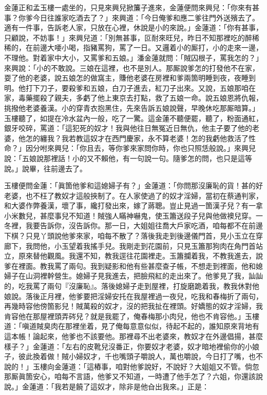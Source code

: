 金蓮正和孟玉樓一處坐的，只見來興兒掀簾子進來，金蓮便問來興兒：「你來有甚事？你爹今日往誰家吃酒去了？」來興道：「今日俺爹和應二爹往門外送殯去了。適有一件事，告訴老人家，只放在心裡，休說是小的來說。」金蓮道：「你有甚事，只顧說，不妨事！」來興兒道：「別無甚事，叵耐來旺兒，昨日不知那裡吃的醉稀稀的，在前邊大喓小喝，指豬罵狗，罵了一日。又邏着小的厮打，小的走來一邊，不理他。對着家中大小，又罵爹和五娘。」潘金蓮就問：「賊囚根子，罵我怎的？」來興說：「小的不敢說。三娘在這裡，也不是別人。那厮說爹怎的打發他不在家，耍了他的老婆，說五娘怎的做窩主，賺他老婆在房裡和爹兩箇明睡到夜，夜睡到明。他打下刀子，要殺爹和五娘，白刀子進去，紅刀子出來。又說，五娘那咱在家，毒藥擺殺了親夫，多虧了他上東京去打點，救了五娘一命。說五娘恩將仇報，挑撥他老婆養漢。小的穿青衣抱黑住，先來告訴五娘說聲，早晚休吃那厮暗算。」玉樓聽了，如提在冷水盆內一般，吃了一驚。這金蓮不聽便罷，聽了，粉面通紅，銀牙咬碎，罵道：「這犯死的奴才！我與他往日無冤近日無仇，他主子要了他的老婆，他怎的纏我？我若教這奴才在西門慶家，永不算老婆！怎的我虧他救活了性命？」因分咐來興兒：「你且去，等你爹來家問你時，你也只照恁般說。」來興兒說：「五娘說那裡話！小的又不賴他，有一句說一句。隨爹怎的問，也只是這等說。」{}說畢，往前邊去了。

玉樓便問金蓮：「眞箇他爹和這媳婦子有？」{}金蓮道：「你問那沒廉恥的貨！甚的好老婆，也不枉了教奴才這般挾制了。在人家使過了的奴才淫婦，當初在蔡通判家，和大婆作弊養漢，壞了事，纔打發出來，嫁了蔣聰。{}豈止見過一箇漢子兒？有一拿小米數兒，甚麼事兒不知道！賊強人瞞神嚇鬼，使玉簫送段子兒與他做襖兒穿。一冬裡，我要告訴你，沒告訴你。那一日，大姐姐往喬大戶家吃酒，咱每都不在前邊下棋？只見丫頭說他爹來家，咱每不散了？落後我走到後邊儀門首，見小玉立在穿廊下，我問他，小玉望着我搖手兒。我剛走到花園前，只見玉簫那狗肉在角門首站立，原來替他觀風。我還不知，教我逕往花園裡走。玉簫攔着我，不教我進去，說爹在裡面。教我罵了兩句。我到疑影和他有些甚麼查子帳，不想走到裡面，他和媳婦子在山洞裡幹營生。{}媳婦子見我進去，把臉飛紅的走出來了。他爹見了我，訕訕的，吃我罵了兩句『沒廉恥』。落後媳婦子走到屋裡，打旋磨跪着我，教我休對他娘說。落後正月裡，他爹要把淫婦安托在我屋裡過一夜兒，吃我和春梅折了兩句，再幾時容他傍箇影兒！賊萬殺的奴才，沒的把我扯在裡頭。好嬌態的奴才淫婦，我肯容他在那屋裡頭弄硶兒？就是我罷了，俺春梅那小肉兒，他也不肯容他。」玉樓道：「嗔道賊臭肉在那裡坐着，見了俺每意意似似，待起不起的，誰知原來背地有這本帳！{}論起來，他爹也不該要他。那裡尋不出老婆來，教奴才在外邊倡揚，甚麼樣子？」金蓮道：「左右的皮靴兒沒番正，你要奴才老婆，奴才暗地裡偷你的小娘子，彼此換着做！賊小婦奴才，千也嘴頭子嚼說人，萬也嚼說，今日打了嘴，也不說的！」{}玉樓向金蓮道：「這樁事，咱對他爹說好，不說好？大姐姐又不管。倘忽那厮眞箇安心，咱每不言語，他爹又不知道，一時遭了他手怎了？六姐，你還該說說。」金蓮道：「我若是饒了這奴才，除非是他㒲出我來。」正是：


